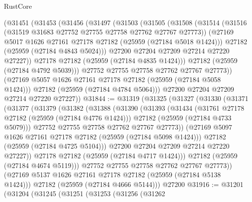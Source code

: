 \begin{lexlean}{RustCore}
\begin{coremodule}
        (@31451
          (@31453
            (@31456
              (@31497
                (@31503
                  (@31505
                    (@31508
                      (@31514
                        (@31516 (@31519 @31683 @27752 @27755 @27758 @27762 @27767 @27773))
                        (@27169 @5017 @1626 @27161 @27178 @27182 (@25959 (@27184 @5018 @1424)))
                        @27182
                        (@25959 (@27184 @4843 @5024)))
                      @27200
                      @27204
                      @27209
                      @27214
                      @27220
                      @27227))
                  @27178
                  @27182
                  (@25959 (@27184 @4835 @1424)))
                @27182
                (@25959 (@27184 @4792 @5039)))
              @27752
              @27755
              @27758
              @27762
              @27767
              @27773))
          (@27169 @5057 @1626 @27161 @27178 @27182 (@25959 (@27184 @5058 @1424)))
          @27182
          (@25959 (@27184 @4784 @5064)))
        @27200
        @27204
        @27209
        @27214
        @27220
        @27227))
@31844 := @31319
    (@31325
      (@31327
        (@31330
          (@31371
            (@31377
              (@31379
                (@31382
                  (@31388
                    (@31390
                      (@31393
                        (@31434
                          (@31761 @27178 @27182 (@25959 (@27184 @4776 @1424)))
                          @27182
                          (@25959 (@27184 @4733 @5079)))
                        @27752
                        @27755
                        @27758
                        @27762
                        @27767
                        @27773))
                    (@27169 @5097 @1626 @27161 @27178 @27182 (@25959 (@27184 @5098 @1424)))
                    @27182
                    (@25959 (@27184 @4725 @5104)))
                  @27200
                  @27204
                  @27209
                  @27214
                  @27220
                  @27227))
              @27178
              @27182
              (@25959 (@27184 @4717 @1424)))
            @27182
            (@25959 (@27184 @4674 @5119)))
          @27752
          @27755
          @27758
          @27762
          @27767
          @27773))
      (@27169 @5137 @1626 @27161 @27178 @27182 (@25959 (@27184 @5138 @1424)))
      @27182
      (@25959 (@27184 @4666 @5144)))
    @27200
@31916 := @31201
    (@31204
      (@31245
        (@31251
          (@31253
            (@31256
              (@31262

\end{coremodule}
\end{lexlean}
